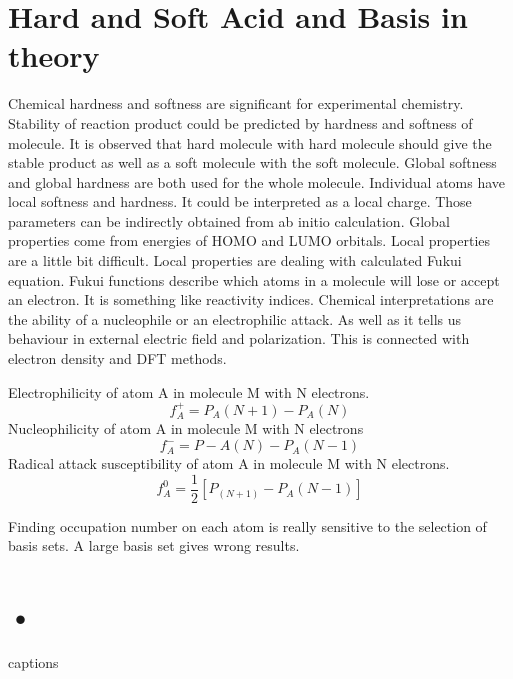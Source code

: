 \documentclass[
  digital, %
  table,   %
  lof,     %
  lot,     %
]{fithesis3}
\begin{document}
\section{Hard and Soft Acid and Basis in theory}
Chemical hardness and softness are significant for experimental chemistry. Stability of reaction product could be predicted by hardness and softness of molecule. It is observed that hard molecule with hard molecule should give the stable product as well as a soft molecule with the soft molecule. Global softness and global hardness are both used for the whole molecule. Individual atoms have local softness and hardness. It could be interpreted as a local charge. Those parameters can be indirectly obtained from ab initio calculation. Global properties come from energies of HOMO and LUMO orbitals. Local properties are a little bit difficult. Local properties are dealing with calculated Fukui equation. Fukui functions
describe which atoms in a molecule will lose or accept an electron. It is something like reactivity indices. Chemical interpretations are the ability of a nucleophile or an electrophilic attack. As well as it tells us behaviour in external electric field and polarization. This is connected with electron density and DFT methods.

Electrophilicity of atom A in molecule M with N electrons.
\begin{equation}
f_A^+ = P_A(N+1) - P_A(N)
\end{equation}
Nucleophilicity of atom A in molecule M with N electrons
\begin{equation}
f_A^- = P-A(N) - P_A(N-1)
\end{equation}
Radical attack susceptibility of atom A in molecule M with N electrons.
\begin{equation}
f_A^0 = \frac{1}{2}[P_(N+1) - P_A(N-1)]
\end{equation}

Finding occupation number on each atom is really sensitive to the selection of basis sets. A large basis set gives wrong results.

\section{•}











{\csname captions\languagename\endcsname %
\makeatletter %
  \thesis@selectLocale{\thesis@locale}\makeatother
\printbibliography[heading=bibintoc]} %
\appendix %
\end{document}
